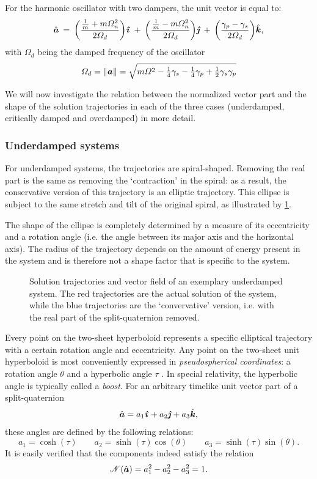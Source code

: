 For the harmonic oscillator with two dampers, the unit vector is equal to:
$$ \uvec{a} \:= \:\qty(\frac{\tfrac{1}{m} + m\Omega_n^2}{2\Omega_d})\quati \: + \:\qty(\frac{\tfrac{1}{m} - m\Omega_n^2}{2\Omega_d})\quatj \:+ \:\qty(\frac{\gamma_p - \gamma_s}{2\Omega_d})\quatk,$$
with $\Omega_d$ being the damped frequency of the oscillator
$$ \Omega_d = \norm{\vec{a}} = \sqrt{m\Omega^2 - \tfrac{1}{4}\gamma_s - \tfrac{1}{4}\gamma_p + \tfrac{1}{2}\gamma_s \gamma_p} $$

We will now investigate the relation between the normalized vector part and the shape of the solution trajectories in each of the three cases (underdamped, critically damped and overdamped) in more detail.

\subsubsection{Underdamped systems}
For underdamped systems, the trajectories are spiral-shaped. Removing the real part is the same as removing the `contraction' in the spiral: as a result, the conservative version of this trajectory is an elliptic trajectory. This ellipse is subject to the same stretch and tilt of the original spiral, as illustrated by \cref{fig:underdamped}. 

The shape of the ellipse is completely determined by a measure of its eccentricity and a rotation angle (i.e. the angle between its major axis and the horizontal axis). The radius of the trajectory depends on the amount of energy present in the system and is therefore not a shape factor that is specific to the system.

\begin{figure}[ht!]
    \centering
    
    \caption{Solution trajectories and vector field of an exemplary underdamped system. The red trajectories are the actual solution of the system, while the blue trajectories are the `convervative' version, i.e. with the real part of the split-quaternion removed.}
    \label{fig:underdamped}
\end{figure}

Every point on the two-sheet hyperboloid represents a specific elliptical trajectory with a certain rotation angle and eccentricity. Any point on the two-sheet unit hyperboloid is most conveniently expressed in \emph{pseudospherical coordinates}: a rotation angle $\theta$ and a hyperbolic angle $\tau$ \cite{Balazs1986}. In special relativity, the hyperbolic angle is typically called a \emph{boost}. For an arbitrary timelike unit vector part of a split-quaternion 
$$ \uvec{a} = a_1\quati + a_2\quatj + a_3\quatk, $$
these angles are defined by the following relations:
$$ a_1 = \cosh(\tau) \qquad a_2 = \sinh(\tau) \cos(\theta) \qquad a_3 = \sinh(\tau) \sin(\theta). $$
It is easily verified that the components indeed satisfy the relation
$$ \mathscr{N}(\uvec{a}) = a_1^2 - a_2^2 - a_3^2 = 1. $$

